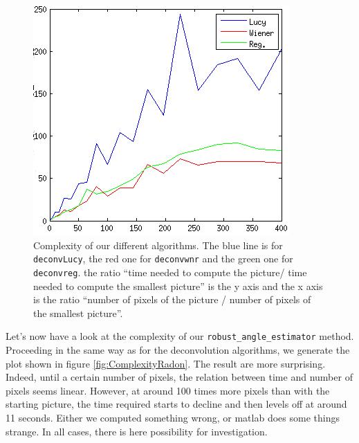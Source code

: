 \begin{figure}[h!]
\centering
\includegraphics[scale=0.7]{../Images/Complexity.png}
\caption{Complexity of our different algorithms. The blue line is for \texttt{deconvLucy}, the red one for \texttt{deconvwnr} and the green one for \texttt{deconvreg}. the ratio ``time needed to compute the picture/ time needed to compute the smallest picture'' is the y axis and the x axis is the ratio ``number of pixels of the picture / number of pixels of the smallest picture''.}
\label{fig:Complexity}
\end{figure}



Let's now have a look at the complexity of our \texttt{robust\_angle\_estimator} method. Proceeding in the same way as for the deconvolution algorithms, we generate the plot shown in figure \ref{fig:ComplexityRadon}. The result are more surprising. Indeed, until a certain number of pixels, the relation between time and number of pixels seems linear. However, at around 100 times more pixels than with the starting picture, the time required starts to decline and then levels off at around 11 seconds. Either we computed something wrong, or matlab does some things strange. In all cases, there is here possibility for investigation.


